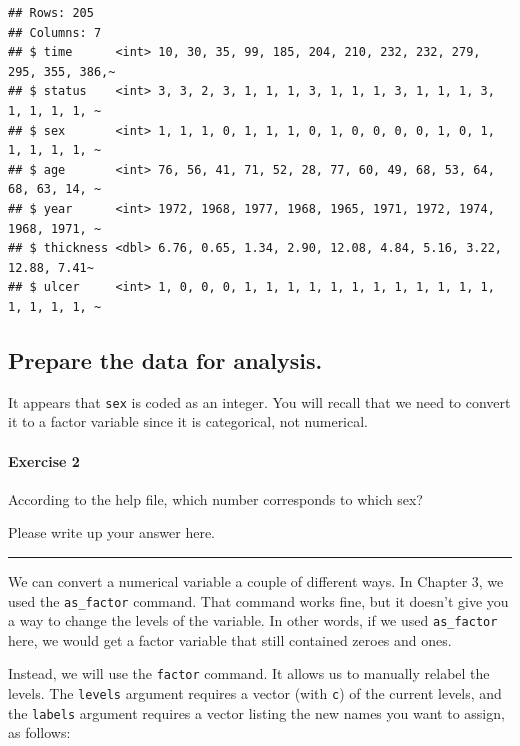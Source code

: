 \documentclass[
]{book}
\begin{document}
\begin{verbatim}
## Rows: 205
## Columns: 7
## $ time      <int> 10, 30, 35, 99, 185, 204, 210, 232, 232, 279, 295, 355, 386,~
## $ status    <int> 3, 3, 2, 3, 1, 1, 1, 3, 1, 1, 1, 3, 1, 1, 1, 3, 1, 1, 1, 1, ~
## $ sex       <int> 1, 1, 1, 0, 1, 1, 1, 0, 1, 0, 0, 0, 0, 1, 0, 1, 1, 1, 1, 1, ~
## $ age       <int> 76, 56, 41, 71, 52, 28, 77, 60, 49, 68, 53, 64, 68, 63, 14, ~
## $ year      <int> 1972, 1968, 1977, 1968, 1965, 1971, 1972, 1974, 1968, 1971, ~
## $ thickness <dbl> 6.76, 0.65, 1.34, 2.90, 12.08, 4.84, 5.16, 3.22, 12.88, 7.41~
## $ ulcer     <int> 1, 0, 0, 0, 1, 1, 1, 1, 1, 1, 1, 1, 1, 1, 1, 1, 1, 1, 1, 1, ~
\end{verbatim}

\hypertarget{hypothesis2-ex-prepare}{%
\subsection{Prepare the data for analysis.}\label{hypothesis2-ex-prepare}}

It appears that \texttt{sex} is coded as an integer. You will recall that we need to convert it to a factor variable since it is categorical, not numerical.

\hypertarget{exercise-2-5}{%
\paragraph*{Exercise 2}\label{exercise-2-5}}

According to the help file, which number corresponds to which sex?

Please write up your answer here.

\begin{center}\rule{0.5\linewidth}{0.5pt}\end{center}

We can convert a numerical variable a couple of different ways. In Chapter 3, we used the \texttt{as\_factor} command. That command works fine, but it doesn't give you a way to change the levels of the variable. In other words, if we used \texttt{as\_factor} here, we would get a factor variable that still contained zeroes and ones.

Instead, we will use the \texttt{factor} command. It allows us to manually relabel the levels. The \texttt{levels} argument requires a vector (with \texttt{c}) of the current levels, and the \texttt{labels} argument requires a vector listing the new names you want to assign, as follows:
\end{document}
